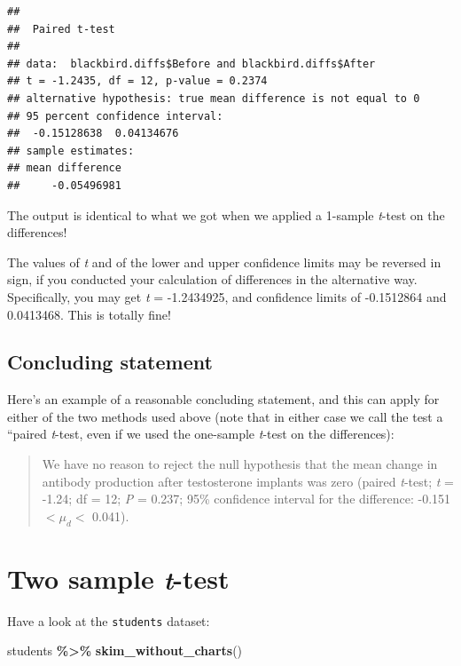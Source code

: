 \documentclass[
]{book}
\newenvironment{Shaded}{\begin{snugshade}}{\end{snugshade}}
\newcommand{\FunctionTok}[1]{\textcolor[rgb]{0.13,0.29,0.53}{\textbf{#1}}}
\newcommand{\NormalTok}[1]{#1}
\newcommand{\SpecialCharTok}[1]{\textcolor[rgb]{0.81,0.36,0.00}{\textbf{#1}}}
\begin{document}
\begin{verbatim}
## 
##  Paired t-test
## 
## data:  blackbird.diffs$Before and blackbird.diffs$After
## t = -1.2435, df = 12, p-value = 0.2374
## alternative hypothesis: true mean difference is not equal to 0
## 95 percent confidence interval:
##  -0.15128638  0.04134676
## sample estimates:
## mean difference 
##     -0.05496981
\end{verbatim}

The output is identical to what we got when we applied a 1-sample \emph{t}-test on the differences!

The values of \emph{t} and of the lower and upper confidence limits may be reversed in sign, if you conducted your calculation of differences in the alternative way. Specifically, you may get \emph{t} = -1.2434925, and confidence limits of -0.1512864 and 0.0413468. This is totally fine!

\subsection{Concluding statement}\label{concl_paired}

Here's an example of a reasonable concluding statement, and this can apply for either of the two methods used above (note that in either case we call the test a ``paired \emph{t}-test, even if we used the one-sample \emph{t}-test on the differences):

\begin{quote}
We have no reason to reject the null hypothesis that the mean change in antibody production after testosterone implants was zero (paired \emph{t}-test; \emph{t} = -1.24; df = 12; \emph{P} = 0.237; 95\% confidence interval for the difference: -0.151 \(< \mu_d <\) 0.041).
\end{quote}

\section{\texorpdfstring{Two sample \emph{t}-test}{Two sample t-test}}\label{twosamp_ttest}

Have a look at the \texttt{students} dataset:

\begin{Shaded}
\begin{Highlighting}[]
\NormalTok{students }\SpecialCharTok{\%\textgreater{}\%}
  \FunctionTok{skim\_without\_charts}\NormalTok{()}
\end{Highlighting}
\end{Shaded}
\end{document}
